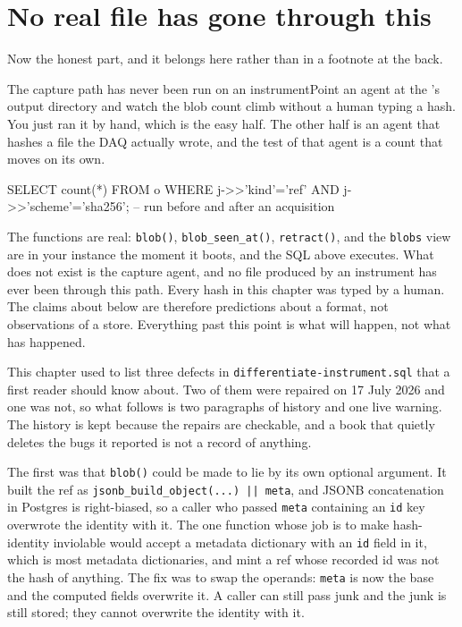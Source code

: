 \section{No real file has gone through this}

Now the honest part, and it belongs here rather than in a footnote at the back.

\begin{Open}{The capture path has never been run on an instrument}{Point an agent at the \labColdSystemShort's output directory and watch the blob count climb without a human typing a hash.}
You just ran it by hand, which is the easy half. The other half is an agent that hashes a \labFileFormat{} file the DAQ actually wrote, and the test of that agent is a count that moves on its own.
\begin{Check}
SELECT count(*) FROM o
 WHERE j->>'kind'='ref' AND j->>'scheme'='sha256';   -- run before and after an acquisition
\end{Check}
The functions are real: \texttt{blob()}, \texttt{blob\_seen\_at()}, \texttt{retract()}, and the \texttt{blobs} view are in your instance the moment it boots, and the SQL above executes. What does not exist is the capture agent, and no file produced by an instrument has ever been through this path. Every hash in this chapter was typed by a human. The claims about \labFileFormat{} below are therefore predictions about a format, not observations of a store. Everything past this point is what will happen, not what has happened.
\end{Open}

This chapter used to list three defects in \texttt{differentiate-instrument.sql} that a first reader should know about. Two of them were repaired on 17 July 2026 and one was not, so what follows is two paragraphs of history and one live warning. The history is kept because the repairs are checkable, and a book that quietly deletes the bugs it reported is not a record of anything.

The first was that \texttt{blob()} could be made to lie by its own optional argument. It built the ref as \texttt{jsonb\_build\_object(...) || meta}, and JSONB concatenation in Postgres is right-biased, so a caller who passed \texttt{meta} containing an \texttt{id} key overwrote the identity with it. The one function whose job is to make hash-identity inviolable would accept a metadata dictionary with an \texttt{id} field in it, which is most metadata dictionaries, and mint a ref whose recorded id was not the hash of anything. The fix was to swap the operands: \texttt{meta} is now the base and the computed fields overwrite it. A caller can still pass junk and the junk is still stored; they cannot overwrite the identity with it.

